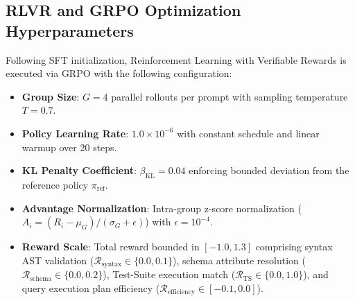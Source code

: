 \documentclass{article}
\theoremstyle{plain}
\theoremstyle{definition}
\theoremstyle{remark}
\begin{document}
\subsection{RLVR and GRPO Optimization Hyperparameters}
Following SFT initialization, Reinforcement Learning with Verifiable Rewards is executed via GRPO with the following configuration:
\begin{itemize}[leftmargin=*,itemsep=2pt]
    \item \textbf{Group Size}: $G = 4$ parallel rollouts per prompt with sampling temperature $T = 0.7$.
    \item \textbf{Policy Learning Rate}: $1.0 \times 10^{-6}$ with constant schedule and linear warmup over 20 steps.
    \item \textbf{KL Penalty Coefficient}: $\beta_{\text{KL}} = 0.04$ enforcing bounded deviation from the reference policy $\pi_{\text{ref}}$.
    \item \textbf{Advantage Normalization}: Intra-group z-score normalization ($A_i = (R_i - \mu_G) / (\sigma_G + \epsilon)$) with $\epsilon = 10^{-4}$.
    \item \textbf{Reward Scale}: Total reward bounded in $[-1.0, 1.3]$ comprising syntax AST validation ($\mathcal{R}_{\text{syntax}} \in \{0.0, 0.1\}$), schema attribute resolution ($\mathcal{R}_{\text{schema}} \in \{0.0, 0.2\}$), Test-Suite execution match ($\mathcal{R}_{\text{TS}} \in \{0.0, 1.0\}$), and query execution plan efficiency ($\mathcal{R}_{\text{efficiency}} \in [-0.1, 0.0]$).
\end{itemize}
\end{document}
